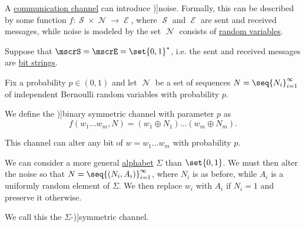 \begin{definition}\label{def:noisy_channel}
  A \hyperref[con:communication_channel]{communication channel} can introduce \term[ru=помехи (\cite[288]{Яблонский2003ДискретнаяМатематика})]{noise}. Formally, this can be described by some function \( f: \mscrS \times \mscrN \to \mscrE \), where \( \mscrS \) and \( \mscrE \) are sent and received messages, while noise is modeled by the set \( \mscrN \) consists of \hyperref[def:random_variable]{random variables}.

  \begin{thmenum}
    \mimprovised Suppose that \( \mscrS = \mscrE = \set{ 0, 1 }^* \), i.e. the sent and received messages are \hyperref[def:bit_string]{bit strings}.

    Fix a probability \( p \in (0, 1) \) and let \( \mscrN \) be a set of sequences \( N = \seq{ N_i }_{i=1}^\infty \) of independent Bernoulli random variables with probability \( p \).

    We define the \term[en=binary symmetric channel (\cite[75]{ConwaySloane1998SpherePackings})]{binary symmetric channel} with parameter \( p \) as
    \begin{equation*}
      f(w_1 \ldots w_m, N) = (w_1 \oplus N_1) \ldots (w_m \oplus N_m).
    \end{equation*}

    This channel can alter any bit of \( w = w_1 \ldots w_m \) with probability \( p \).

    We can consider a more general \hyperref[def:formal_language/alphabet]{alphabet} \( \Sigma \) than \( \set{ 0, 1 } \). We must then alter the noise so that \( N = \seq{ (N_i, A_i) }_{i=1}^\infty \), where \( N_i \) is as before, while \( A_i \) is a uniformly random element of \( \Sigma \). We then replace \( w_i \) with \( A_i \) if \( N_i = 1 \) and preserve it otherwise.

    We call this the \( \Sigma \)-\term[en=symmetric channel (\cite[879]{GowersEtAl2008PrincetonCompanion})]{symmetric channel}.
  \end{thmenum}
\end{definition}

